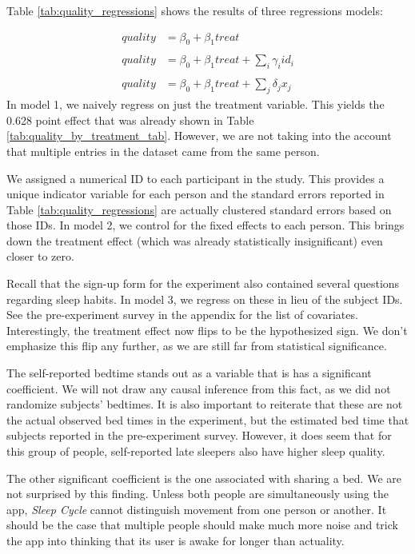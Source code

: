 \documentclass[12pt,]{article}
\begin{document}
Table \ref{tab:quality_regressions} shows the results of three
regressions models:

\[
\begin{aligned}
    quality &= \beta_0 + \beta_1 treat \\\\
    quality &= \beta_0 + \beta_1 treat + \sum_i \gamma_i id_i \\\\
    quality &= \beta_0 + \beta_1 treat + \sum_j \delta_j x_j
\end{aligned}
\] In model 1, we naively regress on just the treatment variable. This
yields the 0.628 point effect that was already shown in Table
\ref{tab:quality_by_treatment_tab}. However, we are not taking into the
account that multiple entries in the dataset came from the same person.

We assigned a numerical ID to each participant in the study. This
provides a unique indicator variable for each person and the standard
errors reported in Table \ref{tab:quality_regressions} are actually
clustered standard errors based on those IDs. In model 2, we control for
the fixed effects to each person. This brings down the treatment effect
(which was already statistically insignificant) even closer to zero.

Recall that the sign-up form for the experiment also contained several
questions regarding sleep habits. In model 3, we regress on these in
lieu of the subject IDs. See the pre-experiment survey in the appendix
for the list of covariates. Interestingly, the treatment effect now
flips to be the hypothesized sign. We don't emphasize this flip any
further, as we are still far from statistical significance.

The self-reported bedtime stands out as a variable that is has a
significant coefficient. We will not draw any causal inference from this
fact, as we did not randomize subjects' bedtimes. It is also important
to reiterate that these are not the actual observed bed times in the
experiment, but the estimated bed time that subjects reported in the
pre-experiment survey. However, it does seem that for this group of
people, self-reported late sleepers also have higher sleep quality.

The other significant coefficient is the one associated with sharing a
bed. We are not surprised by this finding. Unless both people are
simultaneously using the app, \emph{Sleep Cycle} cannot distinguish
movement from one person or another. It should be the case that multiple
people should make much more noise and trick the app into thinking that
its user is awake for longer than actuality.
\end{document}
